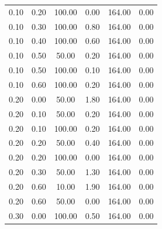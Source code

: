 \begin{table}
\begin{tabular}[c]{|c|c|c|c|c|c|}
        0.10 & 0.20 & 100.00 & 0.00 & 164.00 & 0.00 \\
        0.10 & 0.30 & 100.00 & 0.80 & 164.00 & 0.00 \\
        0.10 & 0.40 & 100.00 & 0.60 & 164.00 & 0.00 \\
        0.10 & 0.50 & 50.00 & 0.20 & 164.00 & 0.00 \\
        0.10 & 0.50 & 100.00 & 0.10 & 164.00 & 0.00 \\
        0.10 & 0.60 & 100.00 & 0.20 & 164.00 & 0.00 \\
        0.20 & 0.00 & 50.00 & 1.80 & 164.00 & 0.00 \\
        0.20 & 0.10 & 50.00 & 0.20 & 164.00 & 0.00 \\
        0.20 & 0.10 & 100.00 & 0.20 & 164.00 & 0.00 \\
        0.20 & 0.20 & 50.00 & 0.40 & 164.00 & 0.00 \\
        0.20 & 0.20 & 100.00 & 0.00 & 164.00 & 0.00 \\
        0.20 & 0.30 & 50.00 & 1.30 & 164.00 & 0.00 \\
        0.20 & 0.60 & 10.00 & 1.90 & 164.00 & 0.00 \\
        0.20 & 0.60 & 50.00 & 0.00 & 164.00 & 0.00 \\
        0.30 & 0.00 & 100.00 & 0.50 & 164.00 & 0.00 \\ \hline
    \end{tabular}
\end{table}

